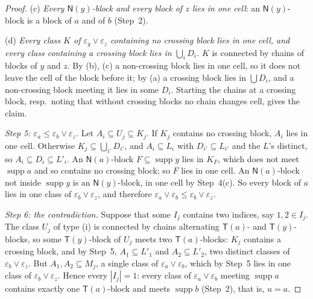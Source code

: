 \documentclass[11pt]{amsart}
\theoremstyle{definition}
\newcommand{\supp}{\operatorname{supp}}
\newcommand{\T}{\mathsf{T}}
\newcommand{\N}{\mathsf{N}}
\begin{document}
\begin{proof}
(c) \emph{Every $\N(y)$-block and every block of $z$ lies in one cell}: an $\N(y)$-block is a block of $a$ and of $b$ (Step~2).

(d) \emph{Every class $K$ of $\varepsilon_y\vee\varepsilon_z$ containing no crossing block lies in one cell, and every class containing a crossing block lies in $\bigcup_iD_i$.} $K$ is connected by chains of blocks of $y$ and $z$. By (b), (c) a non-crossing block lies in one cell, so it does not leave the cell of the block before it; by (a) a crossing block lies in $\bigcup D_i$, and a non-crossing block meeting it lies in some $D_i$. Starting the chains at a crossing block, resp.\ noting that without crossing blocks no chain changes cell, gives the claim.

\smallskip\emph{Step 5: $\varepsilon_a\le\varepsilon_b\vee\varepsilon_z$.} Let $A_i\subseteq U_j\subseteq K_j$. If $K_j$ contains no crossing block, $A_i$ lies in one cell. Otherwise $K_j\subseteq\bigcup_{i'}D_{i'}$, and $A_i\subseteq L_i$ with $D_{i'}\subseteq L_{i'}$ and the $L$'s distinct, so $A_i\subseteq D_i\subseteq L'_i$. An $\N(a)$-block $F\subseteq\supp y$ lies in $K_F$, which does not meet $\supp a$ and so contains no crossing block; so $F$ lies in one cell. An $\N(a)$-block not inside $\supp y$ is an $\N(y)$-block, in one cell by Step~4(c). So every block of $a$ lies in one class of $\varepsilon_b\vee\varepsilon_z$, and therefore $\varepsilon_a\vee\varepsilon_b\le\varepsilon_b\vee\varepsilon_z$.

\smallskip\emph{Step 6: the contradiction.} Suppose that some $I_j$ contains two indices, say $1,2\in I_j$. The class $U_j$ of type (i) is connected by chains alternating $\T(a)$- and $\T(y)$-blocks, so some $\T(y)$-block of $U_j$ meets two $\T(a)$-blocks: $K_j$ contains a crossing block, and by Step~5, $A_1\subseteq L'_1$ and $A_2\subseteq L'_2$, two distinct classes of $\varepsilon_b\vee\varepsilon_z$. But $A_1,A_2\subseteq M_j$, a single class of $\varepsilon_a\vee\varepsilon_b$, which by Step~5 lies in one class of $\varepsilon_b\vee\varepsilon_z$. Hence every $|I_j|=1$: every class of $\varepsilon_a\vee\varepsilon_b$ meeting $\supp a$ contains exactly one $\T(a)$-block and meets $\supp b$ (Step~2), that is, $u=a$.


\end{proof}
\end{document}
